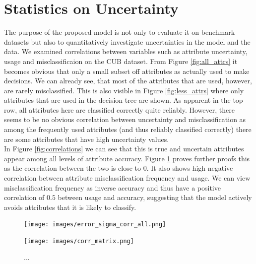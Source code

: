 \documentclass[a4paper,cleardoubleempty,BCOR1cm, 11pt]{report}
\begin{document}
\section{Statistics on Uncertainty}
The purpose of the proposed model is not only to evaluate it on benchmark datasets but also to quantitatively investigate uncertainties in the model and the data. We examined correlations between variables such as attribute uncertainty, usage and misclassificaion on the CUB dataset. From Figure \ref{fig:all_attrs} it becomes obvious that only a small subset off attributes as actually used to make decisions. We can already see, that most of the attributes that are used, however, are rarely misclassified. This is also visible in Figure \ref{fig:less_attrs} where only attributes that are used in the decision tree are shown. As apparent in the top row, all attributes here are classified correctly quite reliably. However, there seems to be no obvious correlation between uncertainty and misclassification as among the frequently used attributes (and thus reliably classified correctly) there are some attributes that have high uncertainty values.\\
In Figure \ref{fig:correlations} we can see that this is true and uncertain attributes appear among all levels of attribute accuracy. Figure \ref{fig:corr_matrix} proves further proofs this as the correlation between the two is close to $0$. It also shows high negative correlation between attribute misclassification frequency and usage. We can view misclassification frequency as inverse accuracy and thus have a positive correlation of $0.5$ between usage and accuracy, suggesting that the model actively avoids attributes that it is likely to classify.


\begin{figure}[t!]
	\centering
	\begin{minipage}{0.45\textwidth}
		\centering
		\texttt{[image: images/error\_sigma\_corr\_all.png]} 
		\caption{...}
		\label{fig:correlations}
	\end{minipage}\hfill
	\begin{minipage}{0.45\textwidth}
		\centering
		\texttt{[image: images/corr\_matrix.png]}
		\caption{...}
		\label{fig:corr_matrix}
	\end{minipage}
\end{figure}
\end{document}
